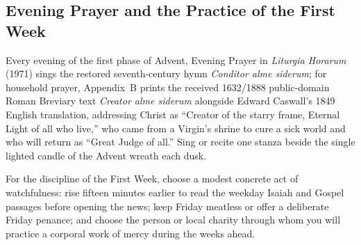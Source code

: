 \subsection{Evening Prayer and the Practice of the First Week}

Every evening of the first phase of Advent, Evening Prayer in \textit{Liturgia Horarum} (1971) sings the restored seventh-century hymn \textit{Conditor alme siderum}; for household prayer, Appendix~B prints the received 1632/1888 public-domain Roman Breviary text \textit{Creator alme siderum} alongside Edward Caswall's 1849 English translation, addressing Christ as ``Creator of the starry frame, Eternal Light of all who live,'' who came from a Virgin's shrine to cure a sick world and who will return as ``Great Judge of all.'' Sing or recite one stanza beside the single lighted candle of the Advent wreath each dusk.

For the discipline of the First Week, choose a modest concrete act of watchfulness: rise fifteen minutes earlier to read the weekday Isaiah and Gospel passages before opening the news; keep Friday meatless or offer a deliberate Friday penance; and choose the person or local charity through whom you will practice a corporal work of mercy during the weeks ahead.
